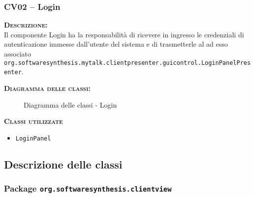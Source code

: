 \subsubsection{CV02 -- Login}\label{sec:cv02}
\begin{description}
  \item{\scshape\bfseries Descrizione:}\\
Il componente \textsf{Login} ha la responsabilità di ricevere in ingresso le credenziali di autenticazione immesse dall'utente del sistema e di trasmetterle al  ad esso associato \texttt{org.softwaresynthesis.mytalk.clientpresenter.guicontrol.LoginPanelPresenter}.

	\item{\scshape\bfseries Diagramma delle classi:}
  \begin{figure}[H]
    \centering
    \caption{Diagramma delle classi - Login}\label{fig:login}
  \end{figure}

  \item{\scshape\bfseries Classi utilizzate}
  \begin{itemize}[noitemsep,nolistsep]
    \item \texttt{LoginPanel}
  \end{itemize}

\end{description}

\subsection{Descrizione delle classi}

\subsubsection{Package \texttt{org.softwaresynthesis.clientview}}

